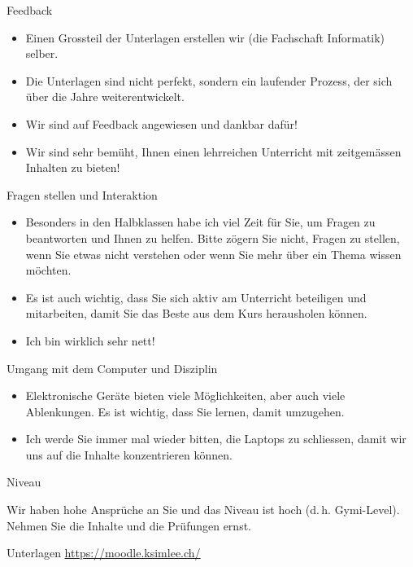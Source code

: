 \begin{frame}[fragile]{Feedback}
	\begin{itemize}
		\item Einen Grossteil der Unterlagen erstellen wir (die Fachschaft Informatik) selber.
		\item Die Unterlagen sind nicht perfekt, sondern ein laufender Prozess, der sich über die Jahre weiterentwickelt.
		\item Wir sind auf Feedback angewiesen und dankbar dafür!
		\item Wir sind sehr bemüht, Ihnen einen lehrreichen Unterricht mit zeitgemässen Inhalten zu bieten!
	\end{itemize}
\end{frame}

\begin{frame}[fragile]{Fragen stellen und Interaktion}
	\begin{itemize}
		\item Besonders in den Halbklassen habe ich viel Zeit für Sie, um Fragen zu beantworten und Ihnen zu helfen. Bitte zögern Sie nicht, Fragen zu stellen, wenn Sie etwas nicht verstehen oder wenn Sie mehr über ein Thema wissen möchten.
		\item Es ist auch wichtig, dass Sie sich aktiv am Unterricht beteiligen und mitarbeiten, damit Sie das Beste aus dem Kurs herausholen können.
		\item Ich bin wirklich sehr nett! 
	\end{itemize}
\end{frame}

\begin{frame}[fragile]{Umgang mit dem Computer und Disziplin}
	\begin{itemize}
		\item Elektronische Geräte bieten viele Möglichkeiten, aber auch viele Ablenkungen. Es ist wichtig, dass Sie lernen, damit umzugehen.
		\item Ich werde Sie immer mal wieder bitten, die Laptops zu schliessen, damit wir uns auf die Inhalte konzentrieren können.
	\end{itemize}
\end{frame}

\begin{frame}[fragile]{Niveau}
	\begin{mycaution}
		Wir haben hohe Ansprüche an Sie und das Niveau ist hoch (d.\,h. Gymi-Level). Nehmen Sie die Inhalte und die Prüfungen ernst.
	\end{mycaution}
\end{frame}

\begin{frame}[fragile]{Unterlagen}
	\url{https://moodle.ksimlee.ch/}
\end{frame}
